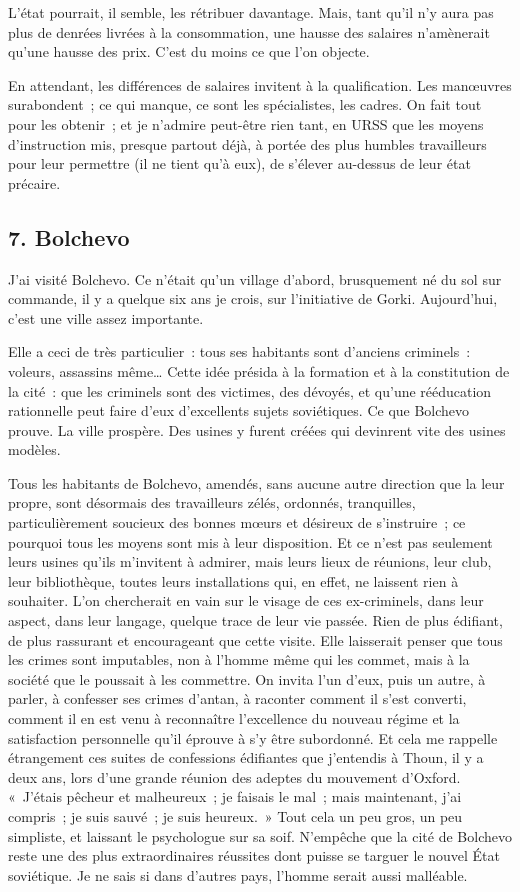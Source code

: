 \documentclass[french,twoside]{book} %
\begin{document}
L’état pourrait, il semble, les rétribuer davantage. Mais, tant qu’il n’y aura pas plus de denrées livrées à la consommation, une hausse des salaires n’amènerait qu’une hausse des prix. C’est du moins ce que l’on objecte.\par
En attendant, les différences de salaires invitent à la qualification. Les manœuvres surabondent ; ce qui manque, ce sont les spécialistes, les cadres. On fait tout pour les obtenir ; et je n’admire peut-être rien tant, en URSS que les moyens d’instruction mis, presque partout déjà, à portée des plus humbles travailleurs pour leur permettre (il ne tient qu’à eux), de s’élever au-dessus de leur état précaire.
\subsection[{7. Bolchevo}]{7. Bolchevo}
\noindent J’ai visité Bolchevo. Ce n’était qu’un village d’abord, brusquement né du sol sur commande, il y a quelque six ans je crois, sur l’initiative de Gorki. Aujourd’hui, c’est une ville assez importante.\par
Elle a ceci de très particulier : tous ses habitants sont d’anciens criminels : voleurs, assassins même… Cette idée présida à la formation et à la constitution de la cité : que les criminels sont des victimes, des dévoyés, et qu’une rééducation rationnelle peut faire d’eux d’excellents sujets soviétiques. Ce que Bolchevo prouve. La ville prospère. Des usines y furent créées qui devinrent vite des usines modèles.\par
Tous les habitants de Bolchevo, amendés, sans aucune autre direction que la leur propre, sont désormais des travailleurs zélés, ordonnés, tranquilles, particulièrement soucieux des bonnes mœurs et désireux de s’instruire ; ce pourquoi tous les moyens sont mis à leur disposition. Et ce n’est pas seulement leurs usines qu’ils m’invitent à admirer, mais leurs lieux de réunions, leur club, leur bibliothèque, toutes leurs installations qui, en effet, ne laissent rien à souhaiter. L’on chercherait en vain sur le visage de ces ex-criminels, dans leur aspect, dans leur langage, quelque trace de leur vie passée. Rien de plus édifiant, de plus rassurant et encourageant que cette visite. Elle laisserait penser que tous les crimes sont imputables, non à l’homme même qui les commet, mais à la société que le poussait à les commettre. On invita l’un d’eux, puis un autre, à parler, à confesser ses crimes d’antan, à raconter comment il s’est converti, comment il en est venu à reconnaître l’excellence du nouveau régime et la satisfaction personnelle qu’il éprouve à s’y être subordonné. Et cela me rappelle étrangement ces suites de confessions édifiantes que j’entendis à Thoun, il y a deux ans, lors d’une grande réunion des adeptes du mouvement d’Oxford. « J’étais pêcheur et malheureux ; je faisais le mal ; mais maintenant, j’ai compris ; je suis sauvé ; je suis heureux. » Tout cela un peu gros, un peu simpliste, et laissant le psychologue sur sa soif. N’empêche que la cité de Bolchevo reste une des plus extraordinaires réussites dont puisse se targuer le nouvel État soviétique. Je ne sais si dans d’autres pays, l’homme serait aussi malléable.
\end{document}
